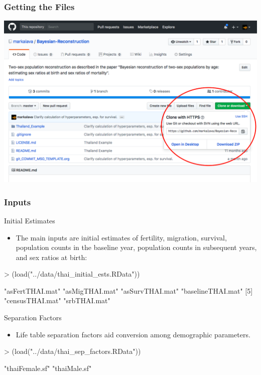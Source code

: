 \documentclass[smaller,compress,table]{beamer}
\begin{document}
\begin{frame}
  \frametitle{Getting the Files}
  \begin{center}
    \includegraphics[width=\linewidth]{extras/github-bayesian-reconstruction.png}
  \end{center}
\end{frame}


\begin{frame}[fragile]
  \frametitle{Inputs}
  \begin{block}{Initial Estimates}
  \begin{itemize}
      \item The main inputs are initial estimates of fertility, migration, survival, population counts in the baseline year, population counts in subsequent years, and sex ratios at birth:
  \end{itemize}

\begin{Schunk}
\begin{Sinput}
> (load("../data/thai_initial_ests.RData"))
\end{Sinput}
\begin{Soutput}
[1] "asFertTHAI.mat"   "asMigTHAI.mat"    "asSurvTHAI.mat"   "baselineTHAI.mat"
[5] "censusTHAI.mat"   "srbTHAI.mat"     
\end{Soutput}
\end{Schunk}

  \end{block}

  \begin{block}{Separation Factors}
  \begin{itemize}
      \item Life table separation factors aid conversion among demographic parameters.
  \end{itemize}

\begin{Schunk}
\begin{Sinput}
> (load("../data/thai_sep_factors.RData"))
\end{Sinput}
\begin{Soutput}
[1] "thaiFemale.sf" "thaiMale.sf"  
\end{Soutput}
\end{Schunk}

  \end{block}
\end{frame}
\end{document}
